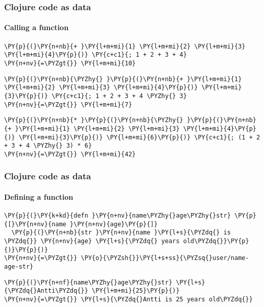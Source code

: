 \begin{frame}[fragile]
  \frametitle{Clojure code as data}
  \framesubtitle {Calling a function}


\begin{Verbatim}[commandchars=\\\{\}]
\PY{p}{(}\PY{n+nb}{+ }\PY{l+m+mi}{1} \PY{l+m+mi}{2} \PY{l+m+mi}{3} \PY{l+m+mi}{4}\PY{p}{)} \PY{c+c1}{; 1 + 2 + 3 + 4}
\PY{n+nv}{=\PYZgt{}} \PY{l+m+mi}{10}
\end{Verbatim}
  \pause

\begin{Verbatim}[commandchars=\\\{\}]
\PY{p}{(}\PY{n+nb}{\PYZhy{} }\PY{p}{(}\PY{n+nb}{+ }\PY{l+m+mi}{1} \PY{l+m+mi}{2} \PY{l+m+mi}{3} \PY{l+m+mi}{4}\PY{p}{)} \PY{l+m+mi}{3}\PY{p}{)} \PY{c+c1}{; 1 + 2 + 3 + 4 \PYZhy{} 3}
\PY{n+nv}{=\PYZgt{}} \PY{l+m+mi}{7}
\end{Verbatim}

  \pause
\begin{Verbatim}[commandchars=\\\{\}]
\PY{p}{(}\PY{n+nb}{* }\PY{p}{(}\PY{n+nb}{\PYZhy{} }\PY{p}{(}\PY{n+nb}{+ }\PY{l+m+mi}{1} \PY{l+m+mi}{2} \PY{l+m+mi}{3} \PY{l+m+mi}{4}\PY{p}{)} \PY{l+m+mi}{3}\PY{p}{)} \PY{l+m+mi}{6}\PY{p}{)} \PY{c+c1}{; (1 + 2 + 3 + 4 \PYZhy{} 3) * 6}
\PY{n+nv}{=\PYZgt{}} \PY{l+m+mi}{42}
\end{Verbatim}
\end{frame}



\begin{frame}[fragile]
  \frametitle{Clojure code as data}
  \framesubtitle{Defining a function}

\begin{Verbatim}[commandchars=\\\{\}]
\PY{p}{(}\PY{k+kd}{defn }\PY{n+nv}{name\PYZhy{}age\PYZhy{}str} \PY{p}{[}\PY{n+nv}{name }\PY{n+nv}{age}\PY{p}{]}
  \PY{p}{(}\PY{n+nb}{str }\PY{n+nv}{name }\PY{l+s}{\PYZdq{} is \PYZdq{}} \PY{n+nv}{age} \PY{l+s}{\PYZdq{} years old\PYZdq{}}\PY{p}{)}\PY{p}{)}
\PY{n+nv}{=\PYZgt{}} \PY{o}{\PYZsh{}}\PY{l+s+ss}{\PYZsq{}user/name-age-str}
\end{Verbatim}

  \pause

\begin{Verbatim}[commandchars=\\\{\}]
\PY{p}{(}\PY{n+nf}{name\PYZhy{}age\PYZhy{}str} \PY{l+s}{\PYZdq{}Antti\PYZdq{}} \PY{l+m+mi}{25}\PY{p}{)}
\PY{n+nv}{=\PYZgt{}} \PY{l+s}{\PYZdq{}Antti is 25 years old\PYZdq{}}
\end{Verbatim}
\end{frame}



